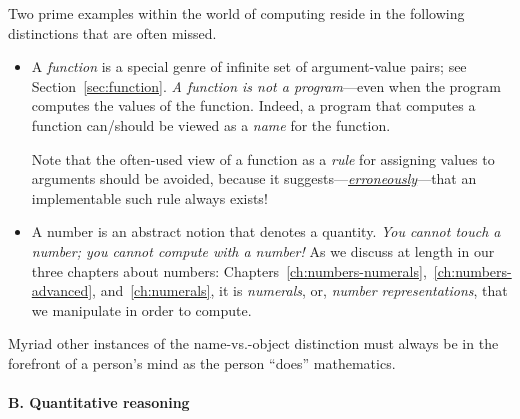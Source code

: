 Two prime examples within the world of computing reside in the
following distinctions that are often missed.
\begin{itemize}
\item
A {\it function} is a special genre of infinite set of argument-value
pairs; see Section~\ref{sec:function}.  {\em A function is not a
  program}---even when the program computes the values of the
function.  Indeed, a program that computes a function can/should be
viewed as a {\it name} for the function.

Note that the often-used view of a function as a {\em rule} for
assigning values to arguments should be avoided, because it
suggests---\underline{\em erroneously}---that an implementable such
rule always exists!

\item
A number is an abstract notion that denotes a quantity.  {\em You
  cannot touch a number; you cannot compute with a number!}  As we
discuss at length in our three chapters about numbers:
Chapters~\ref{ch:numbers-numerals},~\ref{ch:numbers-advanced},
and~\ref{ch:numerals}, it is {\em numerals}, or, {\em number
  representations}, that we manipulate in order to compute.
\end{itemize}
Myriad other instances of the name-vs.-object distinction must always
be in the forefront of a person's mind as the person ``does''
mathematics.

\medskip

\paragraph{\small\sf B. Quantitative reasoning}

